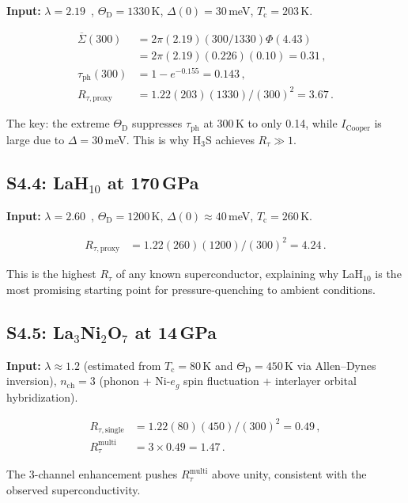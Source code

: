 \documentclass[prb,twocolumn,superscriptaddress,longbibliography,floatfix]{revtex4-2}
\newcommand{\tauasym}{\tau}
\newcommand{\taudec}{\tauasym_{\mathrm{ph}}}
\newcommand{\Icoop}{I_{\mathrm{Cooper}}}
\newcommand{\Rtau}{R_{\tauasym}}
\newcommand{\Tc}{T_{\mathrm{c}}}
\newcommand{\ThetaD}{\Theta_{\mathrm{D}}}
\begin{document}
\textbf{Input:}
$\lambda = 2.19$~\cite{Errea2015_S}, $\ThetaD = 1330\,$K,
$\Delta(0) = 30\,$meV, $\Tc = 203\,$K.

\begin{align}
  \overline{\Sigma}(300) &= 2\pi(2.19)(300/1330)\Phi(4.43) \nonumber\\
  &= 2\pi(2.19)(0.226)(0.10) = 0.31\,, \\
  \taudec(300) &= 1 - e^{-0.155} = 0.143\,, \\
  R_{\tauasym,\text{proxy}} &= 1.22(203)(1330)/(300)^2 = 3.67\,.
\end{align}

The key: the extreme $\ThetaD$ suppresses $\taudec$ at $300\,$K
to only 0.14, while $\Icoop$ is large due to $\Delta = 30\,$meV.
This is why H$_3$S achieves $\Rtau \gg 1$.

\subsection{S4.4: LaH$_{10}$ at 170\,GPa}

\textbf{Input:}
$\lambda = 2.60$~\cite{Errea2020_S}, $\ThetaD = 1200\,$K,
$\Delta(0) \approx 40\,$meV, $\Tc = 260\,$K.

\begin{align}
  R_{\tauasym,\text{proxy}} &= 1.22(260)(1200)/(300)^2 = 4.24\,.
\end{align}

This is the highest $\Rtau$ of any known superconductor, explaining
why LaH$_{10}$ is the most promising starting point for
pressure-quenching to ambient conditions.

\subsection{S4.5: La$_3$Ni$_2$O$_7$ at 14\,GPa}

\textbf{Input:}
$\lambda \approx 1.2$ (estimated from $\Tc = 80\,$K and
$\ThetaD = 450\,$K via Allen--Dynes inversion),
$n_{\mathrm{ch}} = 3$ (phonon + Ni-$e_g$ spin fluctuation +
interlayer orbital hybridization).

\begin{align}
  R_{\tauasym,\text{single}} &= 1.22(80)(450)/(300)^2 = 0.49\,, \\
  \Rtau^{\mathrm{multi}} &= 3 \times 0.49 = 1.47\,.
\end{align}

The 3-channel enhancement pushes $\Rtau^{\mathrm{multi}}$
above unity, consistent with the observed superconductivity.
\end{document}
